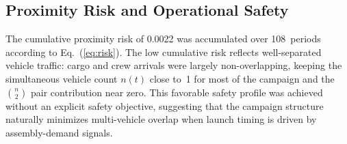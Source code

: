 \subsection{Proximity Risk and Operational Safety}

The cumulative proximity risk of
0.0022 was accumulated
over 108~periods according to
Eq.~(\ref{eq:risk}).
The low cumulative risk reflects well-separated vehicle traffic:
cargo and crew arrivals were largely non-overlapping, keeping
the simultaneous vehicle count $n(t)$ close to~1 for most of the
campaign and the $\binom{n}{2}$ pair contribution near zero.
This favorable safety profile was achieved without an explicit
safety objective, suggesting that the campaign structure
naturally minimizes multi-vehicle overlap when launch timing is
driven by assembly-demand signals.

